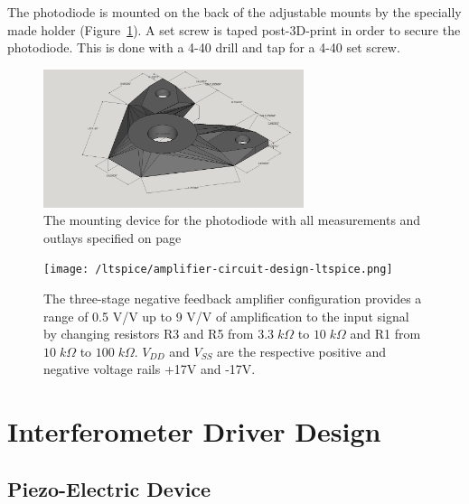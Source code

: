 \documentclass[12pt,journal]{IEEEtran}
\begin{document}
The photodiode is mounted on the back of the adjustable mounts by the specially made holder (Figure~\ref{fig:diode_holder}). A set screw is taped post-3D-print in order to secure the photodiode. This is done with a 4-40 drill and tap for a 4-40 set screw. 

\begin{figure}[h!]
  \centering
	\includegraphics[width=3in]{./mechanical/diode_holder_3d_rep.png}
	\caption[Cavity Mounts]{The mounting device for the photodiode with all measurements and outlays specified on page~\pageref{ss:diode_holder}}
	\label{fig:diode_holder}
\end{figure}

\begin{figure}[tb]
  \centering
	\texttt{[image: /ltspice/amplifier-circuit-design-ltspice.png]}
	\caption{The three-stage negative feedback amplifier configuration provides a range of 0.5 V/V up to 9 V/V of amplification to the input signal by changing resistors R3 and R5 from $3.3\;k\Omega$ to $10\;k\Omega$ and R1 from $10\;k\Omega$ to $100\;k\Omega$. $V_{DD}$ and $V_{SS}$ are the respective positive and negative voltage rails +17V and -17V.}
	\label{fig:amplifier-configuration}
\end{figure}



\section{Interferometer Driver Design}


\subsection{Piezo-Electric Device}
\end{document}
